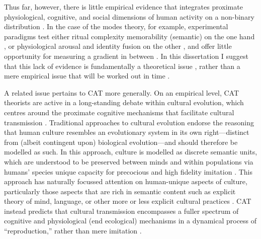 \begin{CJK}{UTF8}{gbsn}
Thus far, however, there is little empirical evidence that integrates proximate physiological, cognitive, and social dimensions of human activity on a non-binary distribution \citep{Atran2010}.  In the case of the modes theory, for example, experimental paradigms test either ritual complexity memorability (semantic) on the one hand \citep{Whitehouse2005}, or physiological arousal and identity fusion on the other \citep{Whitehouse2014,Whitehouse2017,Swann2010a,Richert2005}, and offer little opportunity for measuring a gradient in between \citep[but see][]{Russell2014}.  In this dissertation I suggest that this lack of evidence is fundamentally a theoretical issue \citep{Clark2015}, rather than a mere empirical issue that will be worked out in time \citep[cf.][]{Whitehouse2014a}.


A related issue pertains to CAT more generally.  On an empirical level, CAT theorists are active in a long-standing debate within cultural evolution, which centres around the proximate cognitive mechanisms that facilitate cultural transmission \citep{Acerbi2015,Scott-Phillips2018}.  Traditional approaches to cultural evolution endorse the reasoning that human culture resembles an evolutionary system in its own right---distinct from (albeit contingent upon) biological evolution---and should therefore be modelled as such.  In this approach, culture is modelled as discrete semantic units, which are understood to be preserved between minds and within populations via humans' species unique capacity for precocious and high fidelity imitation \citep[i.e., like genes, culture is preserved through processes of exact replication with natural copying error and drift][]{Henrich2003,Tomasello2011}. This approach has naturally focussed attention on human-unique aspects of culture, particularly those aspects that are rich in semantic content such as explicit theory of mind, language, or other more or less explicit cultural practices \citep{Tomasello2005}.  CAT instead predicts that cultural transmission encompasses a fuller spectrum of cognitive and physiological (end ecological) mechanisms in a dynamical process of ``reproduction,'' rather than mere imitation \citep{Claidiere2007,Mesoudi2017}.


\end{CJK}

